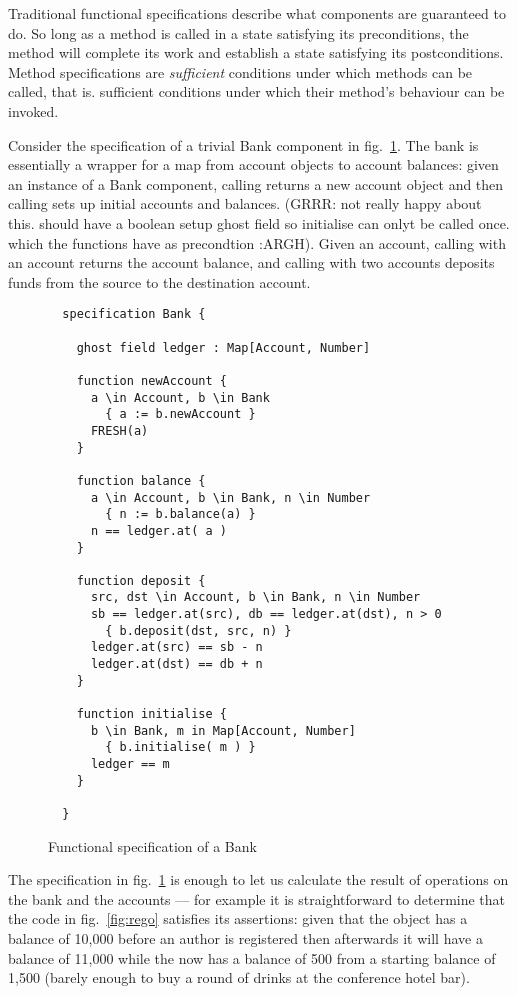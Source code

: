 
\label{section:motivationBank}


Traditional functional specifications describe what components are
guaranteed to do. So long as a method is called in a state satisfying
its preconditions, the method will complete its work and establish a
state satisfying its postconditions.   Method specifications
are \textit{sufficient} conditions under which methods can be called,
that is. sufficient conditions under which their method's behaviour
can be invoked.


Consider the specification of a trivial Bank component in
fig.~\ref{fig:BankSpec}.  The bank is essentially a wrapper for a map
from account objects to account balances: given an instance of a Bank
component, calling  returns a new account object and
then calling  sets up initial accounts and balances.
(GRRR: not really happy about this. should have a boolean setup ghost
field so initialise can onlyt be called once. which the functions have
as precondtion :ARGH).  Given an account, calling  with an
account returns the account balance, and calling  with
two accounts deposits funds from the source to the destination account.


\begin{figure}[tbp]
\begin{lstlisting}
  specification Bank {

    ghost field ledger : Map[Account, Number]

    function newAccount {
      a \in Account, b \in Bank
        { a := b.newAccount }
      FRESH(a)
    }

    function balance {
      a \in Account, b \in Bank, n \in Number
        { n := b.balance(a) }
      n == ledger.at( a )
    }

    function deposit {
      src, dst \in Account, b \in Bank, n \in Number
      sb == ledger.at(src), db == ledger.at(dst), n > 0
        { b.deposit(dst, src, n) }
      ledger.at(src) == sb - n
      ledger.at(dst) == db + n
    }

    function initialise {
      b \in Bank, m in Map[Account, Number]
        { b.initialise( m ) }
      ledger == m
    }

  }
\end{lstlisting}
\caption{Functional specification of a Bank}
\label{fig:BankSpec}
\end{figure}

The specification in fig.~\ref{fig:BankSpec} is enough to let us
calculate the result of operations on the bank and the accounts ---
for example it is straightforward to determine that the code in
fig.~\ref{fig:rego} satisfies its assertions: given that the
 object has a balance of 10,000 before an author is
registered then afterwards it will have a balance of 11,000 while the
 now has a balance of 500 from a starting balance of 1,500
(barely enough to buy a round of drinks at the conference hotel bar).


